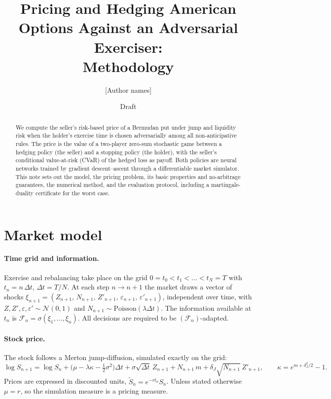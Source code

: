 \documentclass[11pt]{article}
\title{Pricing and Hedging American Options Against an Adversarial Exerciser:\\ Methodology}
\author{[Author names]}
\date{Draft}
\theoremstyle{definition}
\theoremstyle{remark}
\newcommand{\F}{\mathcal{F}}
\newcommand{\St}{\tilde S}
\begin{document}
\maketitle

\begin{abstract}
We compute the seller's risk-based price of a Bermudan put under jump and liquidity risk when the holder's
exercise time is chosen adversarially among all non-anticipative rules. The price is the value of a
two-player zero-sum stochastic game between a hedging policy (the seller) and a stopping policy (the
holder), with the seller's conditional value-at-risk (CVaR) of the hedged loss as payoff. Both policies are
neural networks trained by gradient descent--ascent through a differentiable market simulator. This note
sets out the model, the pricing problem, its basic properties and no-arbitrage guarantees, the numerical
method, and the evaluation protocol, including a martingale-duality certificate for the worst case.
\end{abstract}

\section{Market model}

\paragraph{Time grid and information.}
Exercise and rebalancing take place on the grid $0=t_0<t_1<\dots<t_N=T$ with $t_n=n\,\Delta t$,
$\Delta t=T/N$. At each step $n\to n+1$ the market draws a vector of shocks
$\xi_{n+1}=(Z_{n+1},\,N_{n+1},\,Z'_{n+1},\,\varepsilon_{n+1},\,\varepsilon'_{n+1})$, independent over time,
with $Z,Z',\varepsilon,\varepsilon'\sim\mathcal N(0,1)$ and $N_{n+1}\sim\mathrm{Poisson}(\lambda\Delta t)$.
The information available at $t_n$ is $\F_n=\sigma(\xi_1,\dots,\xi_n)$. All decisions are required to be
$(\F_n)$-adapted.

\paragraph{Stock price.}
The stock follows a Merton jump-diffusion, simulated exactly on the grid:
\begin{equation}\label{eq:merton}
\log S_{n+1}=\log S_n+\Big(\mu-\lambda\kappa-\tfrac12\sigma^2\Big)\Delta t+\sigma\sqrt{\Delta t}\,Z_{n+1}
+N_{n+1}\,m+\delta_J\sqrt{N_{n+1}}\,Z'_{n+1},
\qquad \kappa=e^{m+\delta_J^2/2}-1 .
\end{equation}
Prices are expressed in discounted units, $\St_n=e^{-rt_n}S_n$. Unless stated otherwise $\mu=r$, so the
simulation measure is a pricing measure.
\end{document}
